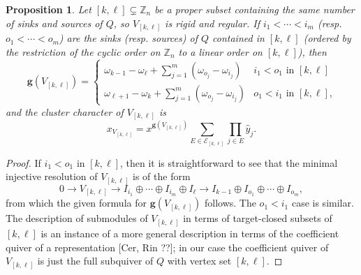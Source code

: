 \documentclass[12pt]{amsart}
\newcommand{\ZZ}{\mathbb{Z}}
\newcommand{\bfg}{\mathbf{g}}
\newcommand{\cE}{\mathcal{E}}
\DeclareMathOperator{\coind}{coind}
\newtheorem{proposition}[theorem]{Proposition}
\theoremstyle{remark}
\numberwithin{equation}{section}
\numberwithin{figure}{section}
\begin{document}
\begin{proposition}\label{prop:regular coindices}
Let $[k,\ell] \subsetneq \ZZ_n$ be a proper subset containing the same number of sinks and sources of $Q$, so $V_{[k,\ell]}$ is rigid and regular. If $i_1 < \cdots < i_m$ (resp. $o_1 < \cdots < o_m$) are the sinks (resp. sources) of $Q$ contained in $[k,\ell]$ (ordered by the restriction of the cyclic order on $\ZZ_n$ to a linear order on $[k,\ell]$), then 
\[
\bfg(V_{[k,\ell]}) = \begin{cases} \omega_{k-1}-\omega_\ell+\sum_{j=1}^m (\omega_{o_j}-\omega_{i_j}) & \text{$i_1<o_1$ in $[k,\ell]$}\\ \omega_{\ell+1}-\omega_k+\sum_{j=1}^m (\omega_{o_j}-\omega_{i_j}) & \text{$o_1 < i_1$ in $[k,\ell]$,}\end{cases}
\]
and the cluster character of $V_{[k,\ell]}$ is 
\begin{equation}\label{eq:regular cluster characters}
x_{V_{[k,\ell]}} = x^{\bfg(V_{[k,\ell]})} \sum_{E \in \cE_{[k,\ell]}} \prod_{j \in E} \hat{y}_j.
\end{equation}
\end{proposition}
\begin{proof}
  If $i_1 < o_1$ in $[k,\ell]$, then it is straightforward to see that the minimal injective resolution of $V_{[k,\ell]}$ is of the form
  \[0\to V_{[k,\ell]} \to I_{i_1} \oplus \cdots \oplus I_{i_m}\oplus I_\ell \to I_{k-1} \oplus I_{o_1} \oplus \cdots \oplus I_{o_m},\] 
from which the given formula for $\bfg(V_{[k,\ell]})$ follows. The $o_1 < i_1$ case is similar. The description of submodules of $V_{[k,\ell]}$ in terms of target-closed subsets of $[k,\ell]$ is an instance of a more general description in terms of the coefficient quiver of a representation [Cer, Rin ??]; in our case the coefficient quiver of $V_{[k,\ell]}$ is just the full subquiver of $Q$ with vertex set $[k,\ell]$. 
\end{proof}
\end{document}
